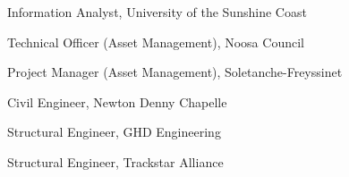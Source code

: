 %
%
%


\begin{scholarship}

					{Information Analyst, University of the Sunshine Coast}

					{Technical Officer (Asset Management), Noosa Council}
					
					{Project Manager (Asset Management), Soletanche-Freyssinet}

					{Civil Engineer, Newton Denny Chapelle}
					
					{Structural Engineer, GHD Engineering}	
					
					{Structural Engineer, Trackstar Alliance}						
\end{scholarship}